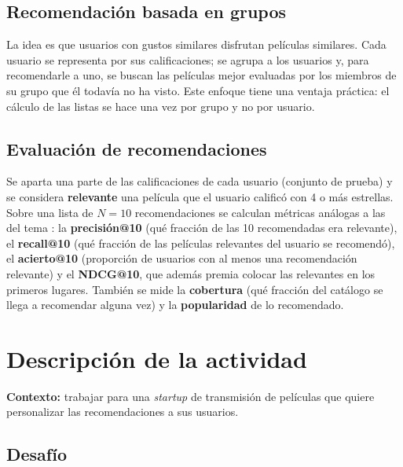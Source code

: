 \documentclass[11pt,letterpaper]{article}
\begin{document}
\subsection{Recomendación basada en grupos}

La idea es que usuarios con gustos similares disfrutan películas similares. Cada usuario se representa por sus calificaciones; se agrupa a los usuarios y, para recomendarle a uno, se buscan las películas mejor evaluadas por los miembros de su grupo que él todavía no ha visto. Este enfoque tiene una ventaja práctica: el cálculo de las listas se hace una vez por grupo y no por usuario.

\subsection{Evaluación de recomendaciones}

Se aparta una parte de las calificaciones de cada usuario (conjunto de prueba) y se considera \textbf{relevante} una película que el usuario calificó con 4 o más estrellas. Sobre una lista de $N=10$ recomendaciones se calculan métricas análogas a las del tema \parencite{iae_u4_t43}: la \textbf{precisión@10} (qué fracción de las 10 recomendadas era relevante), el \textbf{recall@10} (qué fracción de las películas relevantes del usuario se recomendó), el \textbf{acierto@10} (proporción de usuarios con al menos una recomendación relevante) y el \textbf{NDCG@10}, que además premia colocar las relevantes en los primeros lugares. También se mide la \textbf{cobertura} (qué fracción del catálogo se llega a recomendar alguna vez) y la \textbf{popularidad} de lo recomendado.

\section{Descripción de la actividad}

\textbf{Contexto:} trabajar para una \textit{startup} de transmisión de películas que quiere personalizar las recomendaciones a sus usuarios.

\subsection*{Desafío}
\end{document}
